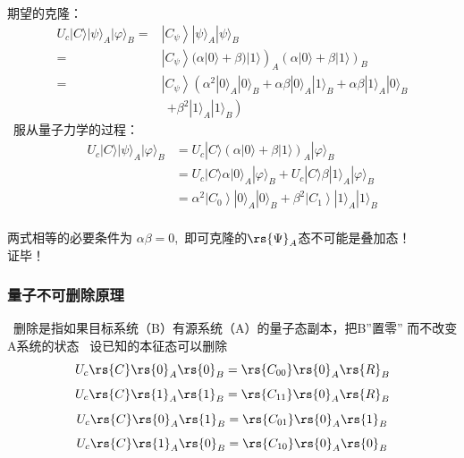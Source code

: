 \begin{frame}
    \frametitle{}
    期望的克隆：
    \[\begin{aligned}
        U_{c}|C\rangle|\psi\rangle_{A}|\varphi\rangle_{B}=&\left|C_{\psi}\right\rangle|\psi\rangle_{A}|\psi\rangle_{B} \\
        =&\left.\left|C_{\psi}\right\rangle(\alpha|0\rangle+\beta)|1\rangle\right)_{A}(\alpha|0\rangle+\beta|1\rangle)_{B} \\
        =&\left|C_{\psi}\right\rangle\left(\alpha^{2}|0\rangle_{A}|0\rangle_{B}+\alpha \beta|0\rangle_{A}|1\rangle_{B}+\alpha \beta|1\rangle_{A}|0\rangle_{B}\right.\\
        &~~\left.+\beta^{2}|1\rangle_{A}|1\rangle_{B}\right)
        \end{aligned} 
    \]
     服从量子力学的过程：
    \[ \begin{aligned}
        U_{c}|C\rangle|\psi\rangle_{A}|\varphi\rangle_{B} &=U_{c}|C\rangle\left(\alpha|0\rangle+\beta|1\rangle\right)_{A}|\varphi\rangle_{B} \\
        &=U_{c}|C\rangle \alpha|0\rangle_{A}|\varphi\rangle_{B}+U_{c}|C\rangle \beta|1\rangle_{A}|\varphi\rangle_{B} \\
        &=\alpha^{2}\left|C_{0}\right\rangle|0\rangle_{A}|0\rangle_{B}+\beta^{2}\left|C_{1}\right\rangle|1\rangle_{A}|1\rangle_{B}
        \end{aligned}
    \]
    ~~\\
    两式相等的必要条件为 $\alpha\beta=0$, 即可克隆的$\rs{\Psi}_A$态不可能是叠加态！\\
    证毕！          
\end{frame}

\begin{frame}
    \frametitle{量子不可删除原理}
    {\Bullet}~删除是指如果目标系统（B）有源系统（A）的量子态副本，把B”置零” 而不改变A系统的状态
    \例[2.试证明未知量子态不可删除]{}
    \证~设已知的本征态可以删除
    \[ U_c\rs{C}\rs{0}_A\rs{0}_B=\rs{C_{00}}\rs{0}_A\rs{R}_B\]
    \[ U_c\rs{C}\rs{1}_A\rs{1}_B=\rs{C_{11}}\rs{0}_A\rs{R}_B\]
    \[ U_c\rs{C}\rs{0}_A\rs{1}_B=\rs{C_{01}}\rs{0}_A\rs{1}_B\]
    \[ U_c\rs{C}\rs{1}_A\rs{0}_B=\rs{C_{10}}\rs{0}_A\rs{0}_B\]
\end{frame}



